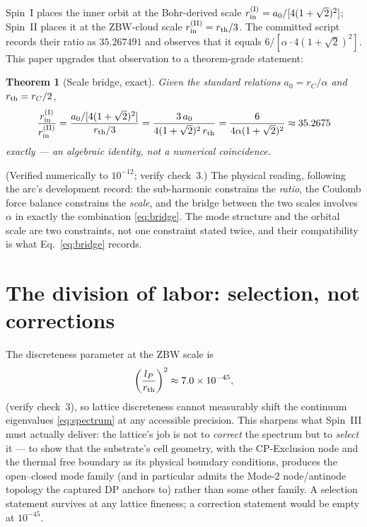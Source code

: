 \documentclass[12pt]{article}
\newcommand{\lP}{l_P}
\newcommand{\rth}{r_{\rm th}}
\newcommand{\rin}{r_{\rm in}}
\newcommand{\rC}{r_C}
\newcommand{\aBohr}{a_0}
\newtheorem{theorem}{Theorem}
\begin{document}
Spin~I places the inner orbit at the Bohr-derived scale
$\rin^{\rm (I)} = \aBohr/[4(1+\sqrt{2})^2]$; Spin~II places it at the
ZBW-cloud scale $\rin^{\rm (II)} = \rth/3$.  The committed script
records their ratio as $35.267491$ and observes that it equals
$6/[\alpha\cdot4(1+\sqrt{2})^2]$.  This paper upgrades that observation
to a theorem-grade statement:

\begin{theorem}[Scale bridge, exact]
Given the standard relations $\aBohr = \rC/\alpha$ and $\rth = \rC/2$,
\begin{equation}
\frac{\rin^{\rm (I)}}{\rin^{\rm (II)}}
= \frac{\aBohr/[4(1+\sqrt{2})^2]}{\rth/3}
= \frac{3\,\aBohr}{4(1+\sqrt{2})^2\,\rth}
= \frac{6}{4\alpha(1+\sqrt{2})^2}
\approx 35.2675
\label{eq:bridge}
\end{equation}
exactly --- an algebraic identity, not a numerical coincidence.
\end{theorem}

\noindent (Verified numerically to $10^{-12}$; verify check~3.)  The
physical reading, following the arc's development record: the
sub-harmonic constrains the \emph{ratio}, the Coulomb force balance
constrains the \emph{scale}, and the bridge between the two scales
involves $\alpha$ in exactly the combination \eqref{eq:bridge}.  The
mode structure and the orbital scale are two constraints, not one
constraint stated twice, and their compatibility is what
Eq.~\eqref{eq:bridge} records.

\section{The division of labor: selection, not corrections}
\label{sec:division}

The discreteness parameter at the ZBW scale is
\begin{equation}
\left(\frac{\lP}{\rth}\right)^2 \approx 7.0\times10^{-45},
\end{equation}
(verify check~3), so lattice discreteness cannot measurably shift the
continuum eigenvalues \eqref{eq:spectrum} at any accessible precision.
This sharpens what Spin~III must actually deliver: the lattice's job is
not to \emph{correct} the spectrum but to \emph{select} it --- to show
that the substrate's cell geometry, with the CP-Exclusion node and the
thermal free boundary as its physical boundary conditions, produces the
open--closed mode family (and in particular admits the Mode-2
node/antinode topology the captured DP anchors to) rather than some
other family.  A selection statement survives at any lattice fineness;
a correction statement would be empty at $10^{-45}$.
\end{document}
